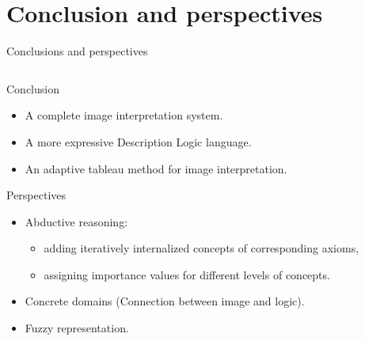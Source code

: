 \documentclass{beamer}
\begin{document}
\section{Conclusion and perspectives}
\begin{frame}{Conclusions and perspectives}
% 
\begin{columns}
 \begin{column}{.7\textwidth}
  
\begin{block}{Conclusion}
 \begin{itemize}
  \item A complete image interpretation system.
  \item A more expressive Description Logic language.
  \item An adaptive tableau method for image interpretation.
 \end{itemize}
\end{block}

\begin{block}{Perspectives}
\begin{itemize}
 \item Abductive reasoning:
 \begin{itemize}
  \item adding iteratively internalized concepts of corresponding axioms,
  \item assigning importance values for different levels of concepts.
 \end{itemize}
 \item Concrete domains (Connection between image and logic).
 \item Fuzzy representation.
\end{itemize}
\end{block}
 \end{column}


\end{columns}
\end{frame}
\end{document}

